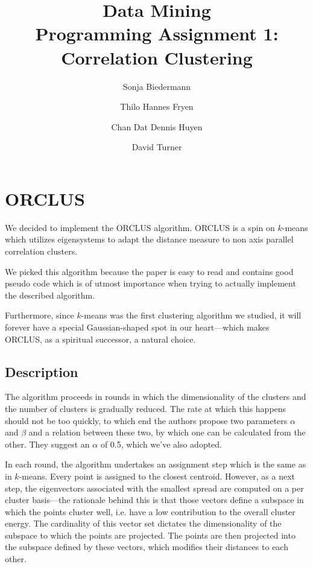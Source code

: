\documentclass[english]{scrartcl}
\begin{document}
\title{Data Mining\\Programming Assignment 1: Correlation Clustering}

\author{Sonja Biedermann \and Thilo Hannes Fryen \and Chan Dat Dennis Huyen \and David Turner}

\maketitle
\tableofcontents

\section{ORCLUS}

We decided to implement the ORCLUS algorithm. ORCLUS is a spin on $k$-means
which utilizes eigensystems to adapt the distance measure to non axis parallel
correlation clusters.

We picked this algorithm because the paper is easy to read and contains good
pseudo code which is of utmost importance when trying to actually implement
the described algorithm.

Furthermore, since $k$-means was the first clustering algorithm we studied, it will forever
have a special Gaussian-shaped spot in our heart---which makes ORCLUS, as a
spiritual successor, a natural choice.

\subsection{Description}

The algorithm proceeds in rounds in which the dimensionality of the clusters
and the number of clusters is gradually reduced. The rate at which this happens should
not be too quickly, to which end the authors propose two parameters $\alpha$ and $\beta$
and a relation between these two, by which one can be calculated from the other. They
suggest an $\alpha$ of 0.5, which we've also adopted.

In each round, the algorithm undertakes an assignment step which is the same as
in $k$-means. Every point is assigned to the closest centroid. However, as a
next step, the eigenvectors associated with the smallest spread are computed on
a per cluster basis---the rationale behind this is that those vectors define a
subspace in which the points cluster well, i.e. have a low contribution to the
overall cluster energy. The cardinality of this vector set dictates the dimensionality
of the subspace to which the points are projected. The points are then projected
into the subspace defined by these vectors, which modifies their distances to
each other.
\end{document}

